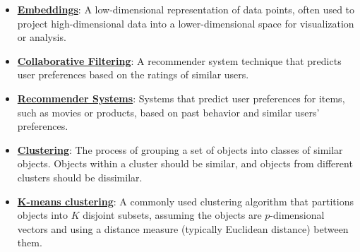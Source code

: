 \documentclass{article}%
\begin{document}
\begin{itemize}[leftmargin=*]
\item \href{https://purdue.brightspace.com/d2l/common/assets/pdfjs-d2l-dist/1.0.14-legacy/web/viewer.html?file=\%2Fcontent\%2Fenforced\%2F1095467-wl.202510.CS.24300.001\%2F11L2-svd-pca-recommender.pdf\%3Fou\%3D1095467\&lang=en-us\&container=d2l-fileviewer-rendered-pdf\&fullscreen=d2l-fileviewer-rendered-pdf-dialog\&height=667#page=5}{\textbf{Embeddings}}: A low-dimensional representation of data points, often used to project high-dimensional data into a lower-dimensional space for visualization or analysis.%
\item \href{https://purdue.brightspace.com/d2l/common/assets/pdfjs-d2l-dist/1.0.14-legacy/web/viewer.html?file=\%2Fcontent\%2Fenforced\%2F1095467-wl.202510.CS.24300.001\%2F11L2-svd-pca-recommender.pdf\%3Fou\%3D1095467\&lang=en-us\&container=d2l-fileviewer-rendered-pdf\&fullscreen=d2l-fileviewer-rendered-pdf-dialog\&height=667#page=33}{\textbf{Collaborative Filtering}}: A recommender system technique that predicts user preferences based on the ratings of similar users.%
\item \href{https://purdue.brightspace.com/d2l/common/assets/pdfjs-d2l-dist/1.0.14-legacy/web/viewer.html?file=\%2Fcontent\%2Fenforced\%2F1095467-wl.202510.CS.24300.001\%2F11L2-svd-pca-recommender.pdf\%3Fou\%3D1095467\&lang=en-us\&container=d2l-fileviewer-rendered-pdf\&fullscreen=d2l-fileviewer-rendered-pdf-dialog\&height=667#page=29}{\textbf{Recommender Systems}}: Systems that predict user preferences for items, such as movies or products, based on past behavior and similar users' preferences.%
\item \href{https://purdue.brightspace.com/d2l/common/assets/pdfjs-d2l-dist/1.0.14-legacy/web/viewer.html?file=\%2Fcontent\%2Fenforced\%2F1095467-wl.202510.CS.24300.001\%2F12L2-distance-clusters.pdf\%3Fou\%3D1095467\&lang=en-us\&container=d2l-fileviewer-rendered-pdf\&fullscreen=d2l-fileviewer-rendered-pdf-dialog\&height=667#page=4}{\textbf{Clustering}}: The process of grouping a set of objects into classes of similar objects. Objects within a cluster should be similar, and objects from different clusters should be dissimilar.%
\item \href{https://purdue.brightspace.com/d2l/common/assets/pdfjs-d2l-dist/1.0.14-legacy/web/viewer.html?file=\%2Fcontent\%2Fenforced\%2F1095467-wl.202510.CS.24300.001\%2F12L2-distance-clusters.pdf\%3Fou\%3D1095467\&lang=en-us\&container=d2l-fileviewer-rendered-pdf\&fullscreen=d2l-fileviewer-rendered-pdf-dialog\&height=667#page=21}{\textbf{K-means clustering}}: A commonly used clustering algorithm that partitions objects into $K$ disjoint subsets, assuming the objects are $p$-dimensional vectors and using a distance measure (typically Euclidean distance) between them.%

\end{itemize}
\end{document}
